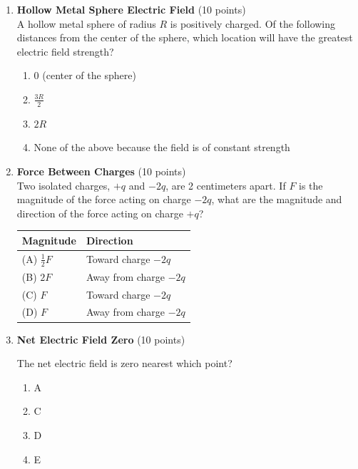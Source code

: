 \begin{enumerate}
  \item \textbf{Hollow Metal Sphere Electric Field} (10 points)\\
  A hollow metal sphere of radius $R$ is positively charged. Of the following distances from the center of the sphere, which location will have the greatest electric field strength?
  \begin{enumerate}[label=(\Alph*)]
    \item 0 (center of the sphere)
    \item $\frac{3R}{2}$
    \item $2R$
    \item None of the above because the field is of constant strength
  \end{enumerate}
  \begin{subanswer}
  \end{subanswer}

  \item \textbf{Force Between Charges} (10 points)\\
  Two isolated charges, $+q$ and $-2q$, are 2 centimeters apart. If $F$ is the magnitude of the force acting on charge $-2q$, what are the magnitude and direction of the force acting on charge $+q$?
  
  \begin{center}
  \begin{tabular}{|l|l|}
  \hline
  \textbf{Magnitude} & \textbf{Direction} \\
  \hline
  (A) $\frac{1}{2}F$ & Toward charge $-2q$ \\
  (B) $2F$ & Away from charge $-2q$ \\
  (C) $F$ & Toward charge $-2q$ \\
  (D) $F$ & Away from charge $-2q$ \\
  \hline
  \end{tabular}
  \end{center}
  \begin{subanswer}
  \end{subanswer}

  \item \textbf{Net Electric Field Zero} (10 points)\\
  
  The net electric field is zero nearest which point?
  \begin{enumerate}[label=(\Alph*)]
    \item A
    \item C
    \item D
    \item E
  \end{enumerate}
  \begin{subanswer}
  \end{subanswer}


\end{enumerate}
